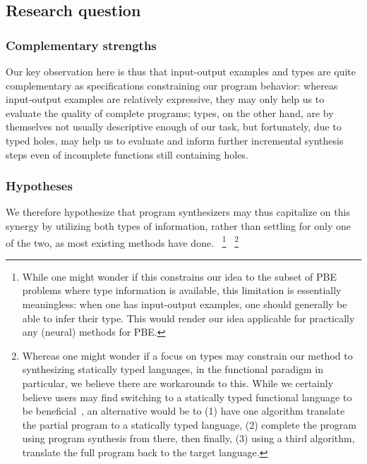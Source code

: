 \documentclass{article}
\begin{document}
\subsection{Research question}

\subsubsection{Complementary strengths}

Our key observation here is thus that input-output examples and types are quite complementary as specifications constraining our program behavior:
whereas input-output examples are relatively expressive, they may only help us to evaluate the quality of complete programs;
types, on the other hand, are by themselves not usually descriptive enough of our task,
but fortunately, due to typed holes,
may help us to evaluate and inform further incremental synthesis steps even of incomplete functions still containing holes.

\subsubsection{Hypotheses}

We therefore hypothesize that program synthesizers may thus capitalize on this synergy by utilizing both types of information,
rather than settling for only one of the two, as most existing methods have done.%
~\footnote{
    While one might wonder if this constrains our idea to the subset of PBE problems where type information is available,
    this limitation is essentially meaningless: when one has input-output examples, one should generally be able to infer their type.
    This would render our idea applicable for practically any (neural) methods for PBE.
}%
~\footnote{
    Whereas one might wonder if a focus on types may constrain our method to synthesizing statically typed languages,
    in the functional paradigm in particular, we believe there are workarounds to this.
    While we certainly believe users may find switching to a statically typed functional language to be beneficial~\citep{hughes1989functional},
    an alternative would be to (1) have one algorithm translate the partial program to a statically typed language,
    (2) complete the program using program synthesis from there,
    then finally, (3) using a third algorithm, translate the full program back to the target language.
}
\end{document}
